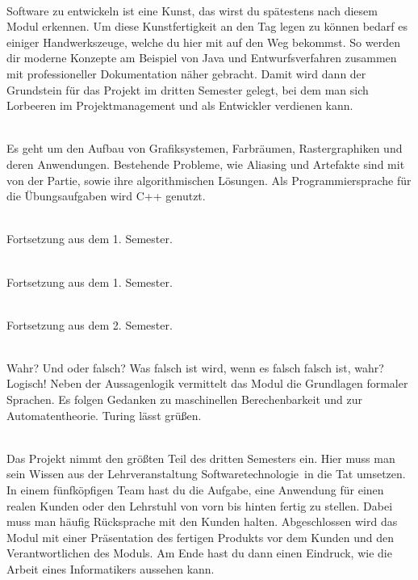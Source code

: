 \textbf{} \\
Software zu entwickeln ist eine Kunst, das wirst du spätestens nach diesem Modul erkennen.
Um diese Kunstfertigkeit an den Tag legen zu können bedarf es einiger Handwerkszeuge, welche du hier mit auf den Weg bekommst.
So werden dir moderne Konzepte am Beispiel von Java und Entwurfsverfahren zusammen mit professioneller Dokumentation näher gebracht.
Damit wird dann der Grundstein für das Projekt im dritten Semester gelegt, bei dem man sich Lorbeeren im Projektmanagement und als Entwickler verdienen kann.

\textbf{} \\
Es geht um den Aufbau von Grafiksystemen, Farbräumen, Rastergraphiken und deren Anwendungen.
Bestehende Probleme, wie Aliasing und Artefakte sind mit von der Partie, sowie ihre algorithmischen Lösungen.
Als Programmiersprache für die Übungsaufgaben wird C++ genutzt.

\textbf{} \\
Fortsetzung aus dem 1. Semester.

\textbf{} \\
Fortsetzung aus dem 1. Semester.



\textbf{} \\
Fortsetzung aus dem 2. Semester.

\textbf{} \\
Wahr?
Und oder falsch?
Was falsch ist wird, wenn es falsch falsch ist, wahr?
Logisch!
Neben der Aussagenlogik vermittelt das Modul die Grundlagen formaler Sprachen.
Es folgen Gedanken zu maschinellen Berechenbarkeit und zur Automatentheorie.
Turing lässt grüßen.

\textbf{} \\
Das Projekt nimmt den größten Teil des dritten Semesters ein.
Hier muss man sein Wissen aus der Lehrveranstaltung \glqq Softwaretechnologie\grqq\ in die Tat umsetzen.
In einem fünfköpfigen Team hast du die Aufgabe, eine Anwendung für einen realen Kunden oder den Lehrstuhl von vorn bis hinten fertig zu stellen.
Dabei muss man häufig Rücksprache mit den Kunden halten.
Abgeschlossen wird das Modul mit einer Präsentation des fertigen Produkts vor dem Kunden und den Verantwortlichen des Moduls.
Am Ende hast du dann einen Eindruck, wie die Arbeit eines Informatikers aussehen kann.

